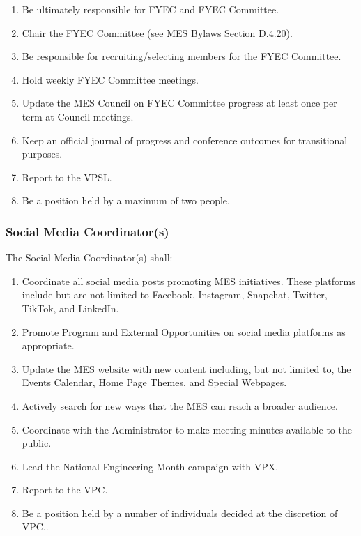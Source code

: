 \begin{enumerate}
 \item
  Be ultimately responsible for FYEC and FYEC Committee.
 \item
  Chair the FYEC Committee (see MES Bylaws Section D.4.20).
 \item
  Be responsible for recruiting/selecting members for the FYEC
  Committee.
 \item
  Hold weekly FYEC Committee meetings.
 \item
  Update the MES Council on FYEC Committee progress at least once per
  term at Council meetings.
 \item
  Keep an official journal of progress and conference outcomes for
  transitional purposes.
 \item
  Report to the VPSL.
 \item
  Be a position held by a maximum of two people.

\end{enumerate}

\hypertarget{social-media-coordinators}{%
 \subsubsection{Social Media
  Coordinator(s)}
 \label{social-media-coordinators}}
The Social Media Coordinator(s) shall:

\begin{enumerate}
 \item
  Coordinate all social media posts promoting MES initiatives. These
  platforms include but are not limited to Facebook, Instagram,
  Snapchat, Twitter, TikTok, and LinkedIn.
 \item
  Promote Program and External Opportunities on social media platforms
  as appropriate.
 \item
  Update the MES website with new content including, but not limited to,
  the Events Calendar, Home Page Themes, and Special Webpages.
 \item
  Actively search for new ways that the MES can reach a broader
  audience.
 \item
  Coordinate with the Administrator to make meeting minutes available to
  the public.
 \item
  Lead the National Engineering Month campaign with VPX.
 \item
  Report to the VPC.
 \item
  Be a position held by a number of individuals decided at the
  discretion of VPC..

\end{enumerate}


